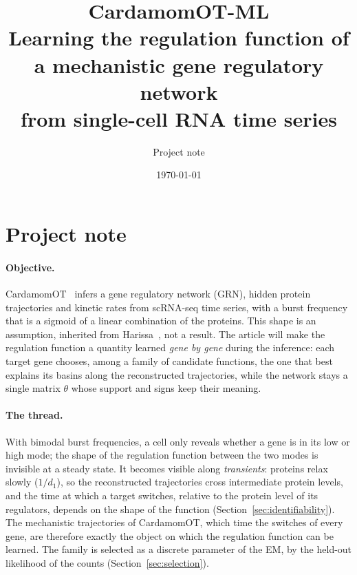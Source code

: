 \documentclass[a4paper, 11pt]{article}
\title{CardamomOT-ML\\[0.3em] \large Learning the regulation function of a mechanistic gene regulatory network\\ from single-cell RNA time series}
\author{Project note}
\date{\today}
\theoremstyle{plain}
\theoremstyle{remark}
\begin{document}
\maketitle

\section*{Project note}

\paragraph{Objective.} CardamomOT~\cite{mauge2026cardamomot} infers a gene regulatory network (GRN), hidden protein trajectories and kinetic rates from scRNA-seq time series, with a burst frequency that is a sigmoid of a linear combination of the proteins. This shape is an assumption, inherited from Harissa~\cite{herbachinferring2017}, not a result. The article will make the regulation function a quantity learned \emph{gene by gene} during the inference: each target gene chooses, among a family of candidate functions, the one that best explains its basins along the reconstructed trajectories, while the network stays a single matrix $\theta$ whose support and signs keep their meaning.

\paragraph{The thread.} With bimodal burst frequencies, a cell only reveals whether a gene is in its low or high mode; the shape of the regulation function between the two modes is invisible at a steady state. It becomes visible along \emph{transients}: proteins relax slowly ($1/d_1$), so the reconstructed trajectories cross intermediate protein levels, and the time at which a target switches, relative to the protein level of its regulators, depends on the shape of the function (Section~\ref{sec:identifiability}). The mechanistic trajectories of CardamomOT, which time the switches of every gene, are therefore exactly the object on which the regulation function can be learned. The family is selected as a discrete parameter of the EM, by the held-out likelihood of the counts (Section~\ref{sec:selection}).
\end{document}
